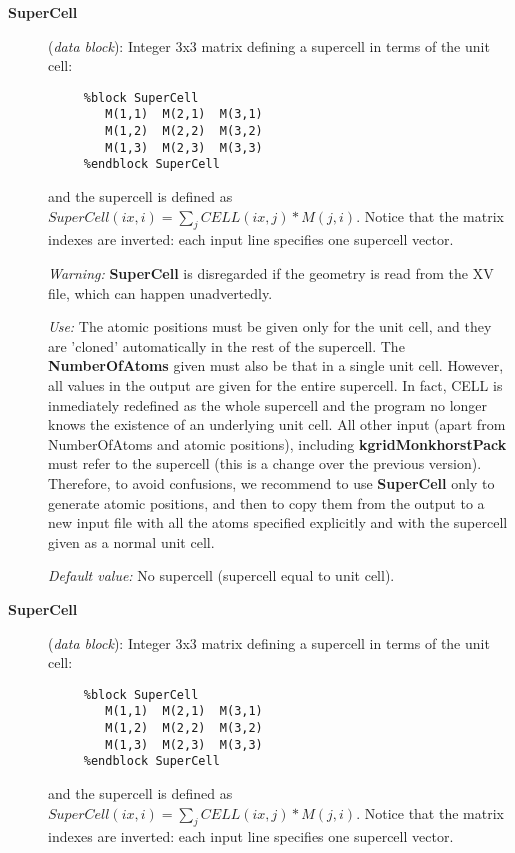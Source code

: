 \documentclass[11pt]{article}
\begin{document}
\begin{description}
\item[{\bf SuperCell}] ({\it data block}): 
Integer 3x3 matrix defining a supercell in terms of the unit cell: 

\begin{verbatim}
     %block SuperCell
        M(1,1)  M(2,1)  M(3,1) 
        M(1,2)  M(2,2)  M(3,2) 
        M(1,3)  M(2,3)  M(3,3) 
     %endblock SuperCell
\end{verbatim}

and the supercell is defined as
$SuperCell(ix,i) = \sum_j CELL(ix,j)*M(j,i)$.
Notice that the matrix indexes are inverted: each input line 
specifies one supercell vector.

{\it Warning:} {\bf SuperCell} is disregarded if the geometry is read from
the XV file, which can happen unadvertedly.

{\it Use:} The atomic positions must be given only for the unit cell,
and they are 'cloned' automatically in the rest of the supercell.
The {\bf NumberOfAtoms} given must also be that in a single unit cell.
However, all values in the output are given for the entire supercell. 
In fact, CELL is inmediately redefined as the whole supercell and the 
program no longer knows the existence of an underlying unit cell.
All other input (apart from NumberOfAtoms and atomic positions), 
including {\bf kgridMonkhorstPack} must refer to the supercell 
(this is a change over the previous version). Therefore, to avoid
confusions, we recommend to use {\bf SuperCell} only to
generate atomic positions, and then to copy them from the output
to a new input file with all the atoms specified explicitly and
with the supercell given as a normal unit cell.

{\it Default value:} No supercell (supercell equal to unit cell).


\item[{\bf SuperCell}] ({\it data block}): 
Integer 3x3 matrix defining a supercell in terms of the unit cell: 

\begin{verbatim}
     %block SuperCell
        M(1,1)  M(2,1)  M(3,1) 
        M(1,2)  M(2,2)  M(3,2) 
        M(1,3)  M(2,3)  M(3,3) 
     %endblock SuperCell
\end{verbatim}

and the supercell is defined as
$SuperCell(ix,i) = \sum_j CELL(ix,j)*M(j,i)$.
Notice that the matrix indexes are inverted: each input line 
specifies one supercell vector.


\end{description}
\end{document}
